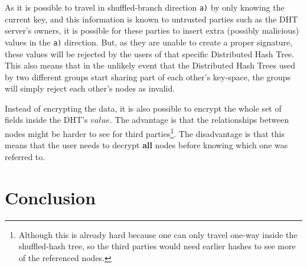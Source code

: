 \documentclass[a4paper]{article}
\begin{document}
As it is possible to travel in shuffled-branch direction \texttt{a)} by only knowing the current key, and this information is known to untrusted parties such as the DHT server's owners, it is possible for these parties to insert extra (possibly malicious) values in the \texttt{a)} direction. But, as they are unable to create a proper signature, these values will be rejected by the users of that specific Distributed Hash Tree. This also means that in the unlikely event that the Distributed Hash Trees used by two different groups start sharing part of each other's key-space, the groups will simply reject each other's nodes as invalid.

Instead of encrypting the data, it is also possible to encrypt the whole set of fields inside the DHT's $value$. The advantage is that the relationships between nodes might be harder to see for third parties\footnote{Although this is already hard because one can only travel one-way inside the shuffled-hash tree, so the third parties would need earlier hashes to see more of the referenced nodes.}. The disadvantage is that this means that the user needs to decrypt \textbf{all} nodes before knowing which one was referred to.

\section{Conclusion}
\end{document}
